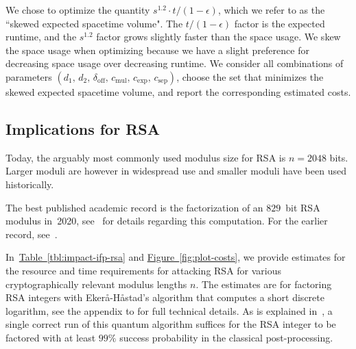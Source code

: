 \documentclass[a4paper, onecolumn, accepted=2021-03-29]{quantumarticle}
\newcommand{\fig}[1]{\hyperref[fig:#1]{Figure~\ref*{fig:#1}}}
\newcommand{\tbl}[1]{\hyperref[tbl:#1]{Table~\ref*{tbl:#1}}}
\newcommand{\devoff}{{\delta_{\text{off}}}}
\newcommand{\gexp}{{c_{\text{exp}}}}
\newcommand{\gmul}{{c_{\text{mul}}}}
\newcommand{\gsep}{{c_{\text{sep}}}}
\newcommand{\distone}{{d_1}}
\newcommand{\disttwo}{{d_2}}
\begin{document}
We chose to optimize the quantity $s^{1.2} \cdot t / (1 - \epsilon)$, which we refer to as the ``skewed expected spacetime volume".
The $t / (1 - \epsilon)$ factor is the expected runtime, and the $s^{1.2}$ factor grows slightly faster than the space usage.
We skew the space usage when optimizing because we have a slight preference for decreasing space usage over decreasing runtime.
We consider all combinations of parameters $(\distone, \, \disttwo, \, \devoff, \, \gmul, \, \gexp, \, \gsep)$, choose the set that minimizes the skewed expected spacetime volume, and report the corresponding estimated costs.

\subsection{Implications for RSA}
Today, the arguably most commonly used modulus size for RSA is $n=2048$ bits.
Larger moduli are however in widespread use and smaller moduli have been used historically.

The best published academic record is the factorization of an $829$~bit RSA modulus in~2020, see~\cite{boudot-rsa829} for details regarding this computation. For the earlier record, see~\cite{kleinjung-rsa768}.

In~\tbl{impact-ifp-rsa} and \fig{plot-costs}, we provide estimates for the resource and time requirements for attacking RSA for various cryptographically relevant modulus lengths $n$. The estimates are for factoring RSA integers with Ekerå-Håstad's algorithm \cite{ekeraa2017quantum,  ekeraa2017pp} that computes a short discrete logarithm, see the appendix to \cite{ekeraa2017pp} for full technical details. As is explained in~\cite{ekeraa2017pp}, a single correct run of this quantum algorithm suffices for the RSA integer to be factored with at least $99\%$ success probability in the classical post-processing.
\end{document}
